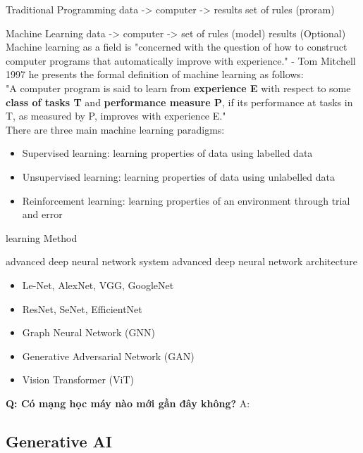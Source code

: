     Traditional Programming
    data
            -> computer -> results
    set of rules (proram)
        
    Machine Learning
    data
            -> computer -> set of rules (model)
    results (Optional)
\\
    Machine learning as a field is "concerned with the question of how to construct computer programs that automatically improve with experience." - Tom Mitchell
    1997 he presents the formal definition of machine learning as follows:\\
    "A computer program is said to learn from \textbf{experience E} with respect to some \textbf{class of tasks T} and \textbf{performance measure P}, if its performance at tasks in T, as measured by P, improves with experience E."\\
    There are three main machine learning paradigms:
    \begin{itemize}
        \item Supervised learning: learning properties of data using labelled data
        \item Unsupervised learning: learning properties of data using unlabelled data
        \item Reinforcement learning: learning properties of an environment through trial and error 
    \end{itemize}




learning Method


advanced deep neural network system
advanced deep neural network architecture
\begin{itemize}
    \item Le-Net, AlexNet, VGG, GoogleNet
    \item ResNet, SeNet, EfficientNet
    \item Graph Neural Network (GNN)
    \item Generative Adversarial Network (GAN)
    \item Vision Transformer (ViT)
\end{itemize}

\textbf{Q: Có mạng học máy nào mới gần đây không?}
A: 




\subsection{Generative AI}
